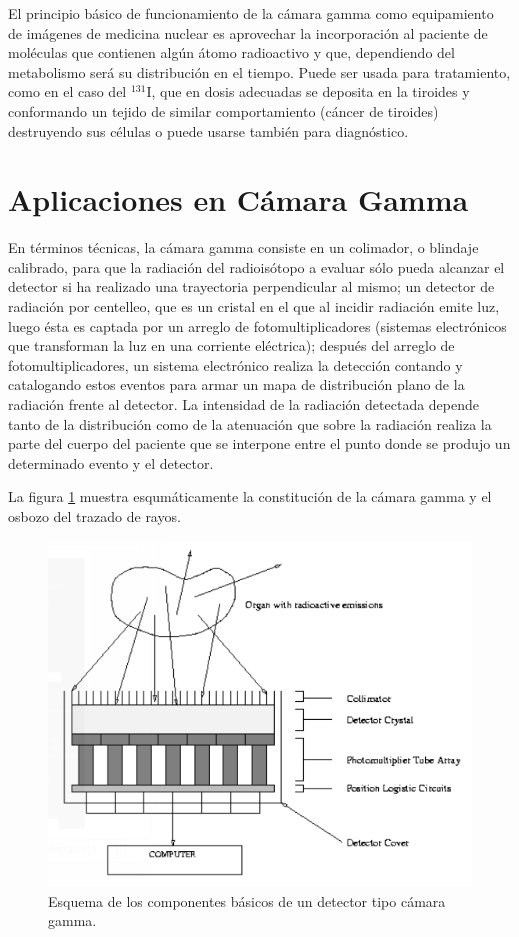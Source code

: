 El principio básico de funcionamiento de la cámara gamma como equipamiento de imágenes de medicina nuclear es aprovechar la incorporación al paciente de moléculas que contienen algún átomo radioactivo y que, dependiendo del metabolismo será su distribución en el tiempo. Puede ser usada para tratamiento, como en el caso del $^{131}$I, que en dosis adecuadas se deposita en la tiroides y conformando un tejido de similar comportamiento (cáncer de tiroides) destruyendo sus células o puede usarse también para diagnóstico.

\section{Aplicaciones en C\'amara Gamma}

En términos técnicas, la cámara gamma consiste en un colimador, o blindaje calibrado, para que la radiación del radioisótopo a evaluar sólo pueda alcanzar el detector si ha realizado una trayectoria perpendicular al mismo; un detector de radiación por centelleo, que es un cristal en el que al incidir radiación emite luz, luego ésta es captada por un arreglo de fotomultiplicadores (sistemas electrónicos que transforman la luz en una corriente eléctrica); después del arreglo de fotomultiplicadores, un sistema electrónico realiza la detección contando y catalogando estos eventos para armar un mapa de distribución plano de la radiación frente al detector. La intensidad de la radiación detectada depende tanto de la distribución como de la atenuación que sobre la radiación realiza la parte del cuerpo del paciente que se interpone entre el punto donde se produjo un determinado evento y el detector.

La figura \ref{appcamgam} muestra esqumáticamente la constitución de la cámara gamma y el osbozo del trazado de rayos.

\begin{figure}
 \centering
 \includegraphics[width = .75\textwidth]{figures/cap9/appcamgam.png}
 \caption{Esquema de los componentes básicos de un detector tipo cámara gamma.}
 \label{appcamgam}
\end{figure}

